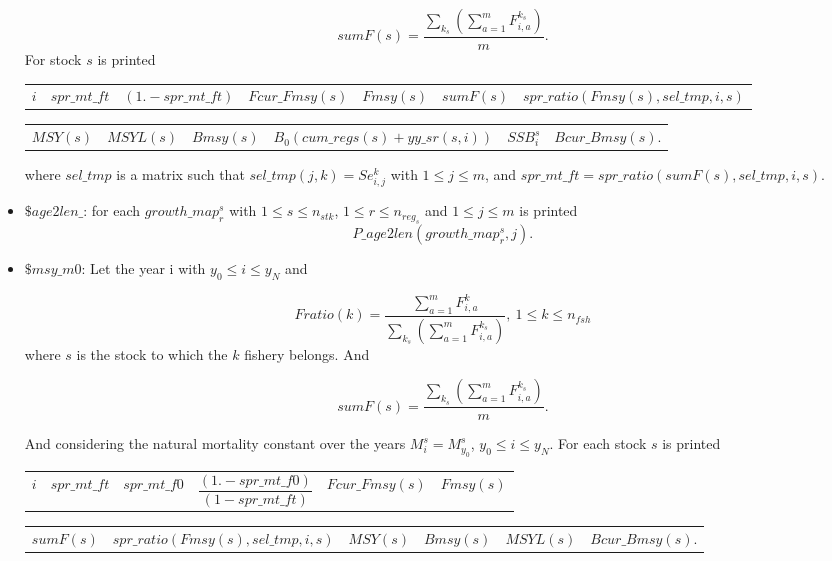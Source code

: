 \documentclass{article}
\begin{document}
\begin{itemize}
\begin{equation*}
    sumF(s)= \dfrac{\sum_{k_s} \left(\sum_{a=1}^mF^{k_s}_{i,a}\right)}{m}.
\end{equation*}
For stock $s$ is printed
\begin{center}
\begin{tabular}{c c c c c c c  }
    $i$ & $spr\_mt\_ft$ & $(1.-spr\_mt\_ft)$ & $Fcur\_Fmsy(s)$ & $Fmsy(s)$ & $sumF(s)$ & $spr\_ratio(Fmsy(s),sel\_tmp,i,s)$ \\
\end{tabular}
\end{center}
\begin{center}
    \begin{tabular}{c c c c c c}
       $MSY(s)$  &  $MSYL(s)$ & $Bmsy(s) $ & $B_0(cum\_regs(s)+yy\_sr(s,i))$ & $SSB^s_i$ & $Bcur\_Bmsy(s)$. \\
    \end{tabular}
\end{center}
where $sel\_tmp$ is a matrix such that $sel\_tmp(j,k)=Se^k_{i,j}$ with $1\leq j \leq m$, and $spr\_mt\_ft=spr\_ratio(sumF(s), sel\_tmp,i, s)$.

\item $\$ age2len\_$: for each $growth\_map^s_r$ with $1\leq s \leq n_{stk}$, $1\leq r \leq n_{reg_s}$ and $1\leq j \leq m$ is printed
\begin{equation*}
P\_age2len(growth\_map^s_r,j).
\end{equation*}

\item $\$ msy\_m0$: Let the year i with $y_0 \leq i \leq y_N$ and

\begin{equation*}
    Fratio(k)= \dfrac{\sum_{a=1}^mF^k_{i,a}}{\sum_{k_s} \left(\sum_{a=1}^mF^{k_s}_{i,a}\right)}, \ 1\leq k \leq n_{fsh}
\end{equation*}
where $s$ is the stock to which the $k$ fishery belongs. And

\begin{equation}
    sumF(s)= \dfrac{\sum_{k_s} \left(\sum_{a=1}^mF^{k_s}_{i,a}\right)}{m}.
\end{equation}

And considering the natural mortality constant over the years $M^s_i=M^s_{y_0}$, $y_0\leq i \leq y_N$. For each stock $s$ is printed
\begin{center}
    \begin{tabular}{c c c c c c} 
        $i$ & $spr\_mt\_ft$  & $spr\_mt\_f0$ & $\dfrac{(1.-spr\_mt\_f0)}{(1-spr\_mt\_ft)}$ & $Fcur\_Fmsy(s)$ & $Fmsy(s)$\\
    \end{tabular}
\end{center}
\begin{center}
    \begin{tabular}{c c c c c c }
        $sumF(s) $ & $spr\_ratio(Fmsy(s),sel\_tmp,i,s)$ & $MSY(s)$ & $Bmsy(s)$ & $MSYL(s)$ & $Bcur\_Bmsy(s)$.\\
    \end{tabular}
\end{center}


\end{itemize}
\end{document}
